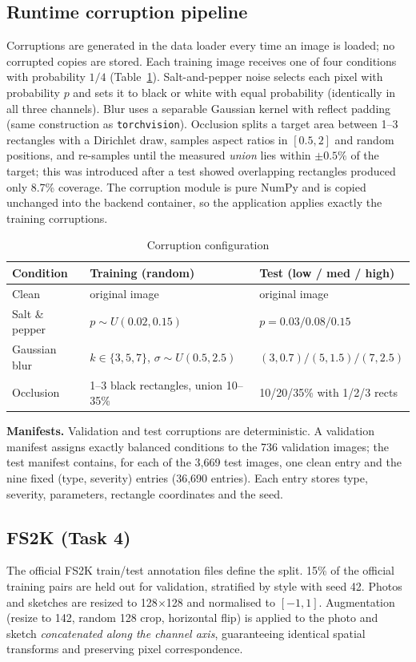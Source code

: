 \documentclass[conference]{IEEEtran}
\begin{document}
\subsection{Runtime corruption pipeline}
Corruptions are generated in the data loader every time an image is loaded; no corrupted copies are stored. Each training image receives one of four conditions with probability $1/4$ (Table~\ref{tab:corr}). Salt-and-pepper noise selects each pixel with probability $p$ and sets it to black or white with equal probability (identically in all three channels). Blur uses a separable Gaussian kernel with reflect padding (same construction as \texttt{torchvision}). Occlusion splits a target area between 1--3 rectangles with a Dirichlet draw, samples aspect ratios in $[0.5,2]$ and random positions, and re-samples until the measured \emph{union} lies within $\pm0.5\%$ of the target; this was introduced after a test showed overlapping rectangles produced only 8.7\% coverage. The corruption module is pure NumPy and is copied unchanged into the backend container, so the application applies exactly the training corruptions.

\begin{table}[t]
\caption{Corruption configuration}\label{tab:corr}
\centering\footnotesize
\begin{tabular}{@{}p{1.45cm}p{3.1cm}p{2.9cm}@{}}
\toprule
Condition & Training (random) & Test (low / med / high)\\\midrule
Clean & original image & original image\\
Salt \& pepper & $p\sim U(0.02,0.15)$ & $p=0.03/0.08/0.15$\\
Gaussian blur & $k\in\{3,5,7\}$, $\sigma\sim U(0.5,2.5)$ & $(3,0.7)/(5,1.5)/(7,2.5)$\\
Occlusion & 1--3 black rectangles, union 10--35\% & 10/20/35\% with 1/2/3 rects\\
\bottomrule
\end{tabular}
\end{table}

\textbf{Manifests.} Validation and test corruptions are deterministic. A validation manifest assigns exactly balanced conditions to the 736 validation images; the test manifest contains, for each of the 3{,}669 test images, one clean entry and the nine fixed (type, severity) entries (36{,}690 entries). Each entry stores type, severity, parameters, rectangle coordinates and the seed.

\subsection{FS2K (Task 4)}
The official FS2K train/test annotation files define the split. 15\% of the official training pairs are held out for validation, stratified by style with seed 42. Photos and sketches are resized to 128$\times$128 and normalised to $[-1,1]$. Augmentation (resize to 142, random 128 crop, horizontal flip) is applied to the photo and sketch \emph{concatenated along the channel axis}, guaranteeing identical spatial transforms and preserving pixel correspondence.
\end{document}

